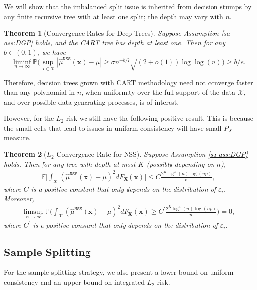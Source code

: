\documentclass[10pt]{article}
\def\bx{\mathbf{x}}
\def\bX{\mathbf{X}}
\def\X{\mathcal{X}}
\def\E{\mathbb{E}}
\def\P{\mathbb{P}}
\def\mudeep{\hat{\mu}^{\mathtt{NSS}}}
\newtheorem{theorem}{Theorem}%
\theoremstyle{definition}
\theoremstyle{remark}
\begin{document}
We will show that the imbalanced split issue is inherited from decision stumps by any finite recursive tree with at least one split; the depth may vary with $n$.



\begin{theorem}[Convergence Rates for Deep Trees]\label{sa-thm: uniform minimax}
Suppose Assumption \ref{sa-ass:DGP} holds, and the CART tree has depth at least one. Then for any $b \in (0, 1) $, we have
$$\liminf_{n\to\infty}\mathbb{P}\Bigg(\sup_{\bx\in\mathcal{X}}|\mudeep(\bx) - \mu| \geq \sigma n^{-b/2}\sqrt{(2+o(1))\log\log(n)}\Bigg) \geq b/e.$$
\end{theorem}

Therefore, decision trees grown with CART methodology need not converge faster than any polynomial in $n$, when uniformity over the full support of the data $\mathcal{X}$, and over possible data generating processes, is of interest.

However, for the $L_2$ risk we still have the following positive result. This is because the small cells that lead to issues in uniform consistency will have small $P_X$ measure.



\begin{theorem}[$L_2$ Convergence Rate for NSS]\label{sa-thm: L2 consistency NSS}
Suppose Assumption \ref{sa-ass:DGP} holds. Then for any tree with depth at most $K$ (possibly depending on $n$),
\begin{align*}
    \E \bigg[ \int_{\X} (\mudeep(\bx) - \mu)^2 dF_{\bX}(\bx)\bigg] \leq C \frac{2^K \log^4(n) \log(np)}{n},
\end{align*}
where $C$ is a positive constant that only depends on the distribution of $\varepsilon_i$. Moreover,
\begin{align*}
    \limsup_{n \to \infty} \P \bigg(\int_{\X} (\mudeep(\bx) - \mu)^2 dF_{\bX}(\bx) \geq C^{\prime} \frac{2^K \log^4(n) \log(np)}{n} \bigg) = 0,
\end{align*}
where $C^{\prime}$ is a positive constant that only depends on the distribution of $\varepsilon_i$.
\end{theorem}

\subsection{Sample Splitting}

For the sample splitting strategy, we also present a lower bound on uniform consistency and an upper bound on integrated $L_2$ risk.
\end{document}
